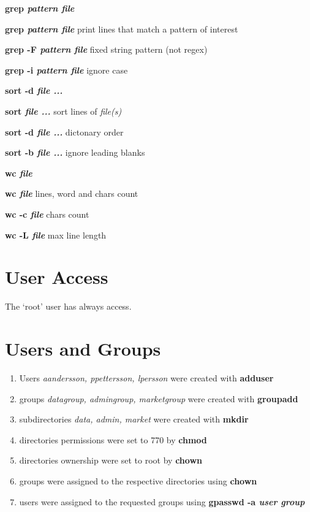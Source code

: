 \documentclass[a4paper,11pt,twoside]{article}
\begin{document}
\vspace{1mm}

\begin{labeling}{\textbf{grep \textit{pattern file}}}
\item [\textbf{grep \textit{pattern file}}] print lines that match a pattern of interest
\item [\textbf{grep -F \textit{pattern file}}] fixed string pattern (not regex)
\item [\textbf{grep -i \textit{pattern file}}] ignore case
\end{labeling}

\vspace{1mm}

\begin{labeling}{\textbf{sort -d \textit{file ...}}}
\item [\textbf{sort \textit{file ...}}] sort lines of \textit{file(s)}
\item [\textbf{sort -d \textit{file ...}}] dictonary order
\item [\textbf{sort -b \textit{file ...}}] ignore leading blanks
\end{labeling}

\vspace{1mm}

\begin{labeling}{\textbf{wc \textit{file}}}
\item [\textbf{wc \textit{file}}] lines, word and chars count
\item [\textbf{wc -c \textit{file}}] chars count
\item [\textbf{wc -L \textit{file}}] max line length
\end{labeling}

\vspace{1mm}


\section{User Access}
The `root' user has always access. 

\section{Users and Groups}
\begin{enumerate}
\item Users \textit{aandersson, ppettersson, lpersson} were created  with \textbf{adduser}
\item groups \textit{datagroup, admingroup, marketgroup} were created with \textbf{groupadd}
\item subdirectories \textit{data, admin, market} were created with \textbf{mkdir}
\item directories permissions were set to 770 by \textbf{chmod}
\item directories ownership were set to root by \textbf{chown}
\item groups were assigned to the respective directories using \textbf{chown}
\item users were assigned to the requested groups using \textbf{gpasswd -a \textit{user group}}
\end{enumerate}
\end{document}
